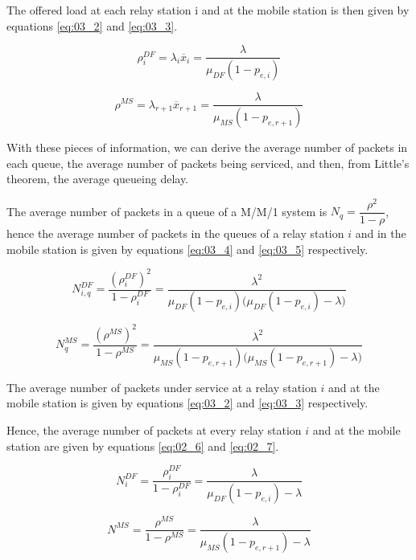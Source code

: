 The offered load at each relay station i and at the mobile station is then given
by equations \ref{eq:03_2} and \ref{eq:03_3}.

\begin{equation}
  \rho_i^{DF} = \lambda_i \overline{x}_i = \dfrac{\lambda}{\mu_{DF} (1 - p_{e,i})}
  \label{eq:03_2}
\end{equation}

\begin{equation}
  \rho^{MS} = \lambda_{r+1} \overline{x}_{r+1} = \dfrac{\lambda}{\mu_{MS} (1 - p_{e,r+1})}
  \label{eq:03_3}
\end{equation}


With these pieces of information, we can derive the average number of packets
in each queue, the average number of packets being serviced, and then, from
Little's theorem, the average queueing delay.

The average number of packets in a queue of a M/M/1 system is
$N_q = \dfrac{\rho^2}{1-\rho}$, hence the average number of packets in the queues
of a relay station $i$ and in the mobile station is given by equations
\ref{eq:03_4} and \ref{eq:03_5} respectively.

\begin{equation}
  N_{i,q}^{DF} = \dfrac{(\rho_i^{DF})^2}{1 - \rho_i^{DF}} = \dfrac{\lambda^2}{\mu_{DF}(1 - p_{e,i})\Big(\mu_{DF}(1 - p_{e,i})- \lambda\Big)}
  \label{eq:03_4}
\end{equation}

\begin{equation}
  N_q^{MS} = \dfrac{(\rho^{MS})^2}{1 - \rho^{MS}} = \dfrac{\lambda^2}{\mu_{MS}(1 - p_{e,r+1})\Big(\mu_{MS}(1 - p_{e,r+1})- \lambda\Big)}
  \label{eq:03_5}
\end{equation}

The average number of packets under service at a relay station $i$ and at the
mobile station is given by equations \ref{eq:03_2} and \ref{eq:03_3} respectively.

Hence, the average number of packets at every relay station $i$ and at the
mobile station are given by equations \ref{eq:02_6} and \ref{eq:02_7}.

\begin{equation}
  N_i^{DF} = \dfrac{\rho_i^{DF}}{1 - \rho_i^{DF}} = \dfrac{\lambda}{\mu_{DF}(1 - p_{e,i}) - \lambda}
  \label{eq:03_6}
\end{equation}

\begin{equation}
  N^{MS} =  \dfrac{\rho^{MS}}{1 - \rho^{MS}} = \dfrac{\lambda}{\mu_{MS}(1 - p_{e,r+1}) - \lambda}
  \label{eq:03_7}
\end{equation}


